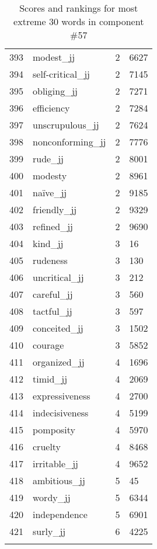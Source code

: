 \begin{longtable}[!htbp]{| rlr@{.}l |}
    393 & modest\_jj & 2 & 6627 \\
    394 & self-critical\_jj & 2 & 7145 \\
    395 & obliging\_jj & 2 & 7271 \\
    396 & efficiency & 2 & 7284 \\
    397 & unscrupulous\_jj & 2 & 7624 \\
    398 & nonconforming\_jj & 2 & 7776 \\
    399 & rude\_jj & 2 & 8001 \\
    400 & modesty & 2 & 8961 \\
    401 & naïve\_jj & 2 & 9185 \\
    402 & friendly\_jj & 2 & 9329 \\
    403 & refined\_jj & 2 & 9690 \\
    404 & kind\_jj & 3 & 16 \\
    405 & rudeness & 3 & 130 \\
    406 & uncritical\_jj & 3 & 212 \\
    407 & careful\_jj & 3 & 560 \\
    408 & tactful\_jj & 3 & 597 \\
    409 & conceited\_jj & 3 & 1502 \\
    410 & courage & 3 & 5852 \\
    411 & organized\_jj & 4 & 1696 \\
    412 & timid\_jj & 4 & 2069 \\
    413 & expressiveness & 4 & 2700 \\
    414 & indecisiveness & 4 & 5199 \\
    415 & pomposity & 4 & 5970 \\
    416 & cruelty & 4 & 8468 \\
    417 & irritable\_jj & 4 & 9652 \\
    418 & ambitious\_jj & 5 & 45 \\
    419 & wordy\_jj & 5 & 6344 \\
    420 & independence & 5 & 6901 \\
    421 & surly\_jj & 6 & 4225 \\
    \hline
    \caption{Scores and rankings for most extreme 30 words in component \#57} \\
\end{longtable}
